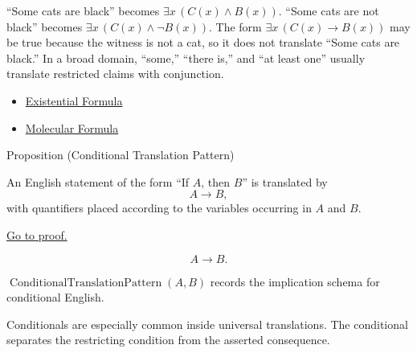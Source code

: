 \begin{remark*}[Exposition]
``Some cats are black'' becomes \(\exists x\,(C(x)\land B(x))\). ``Some cats are
not black'' becomes \(\exists x\,(C(x)\land \neg B(x))\). The form
\(\exists x\,(C(x)\to B(x))\) may be true because the witness is not a cat, so
it does not translate ``Some cats are black.'' In a broad domain, ``some,''
``there is,'' and ``at least one'' usually translate restricted claims with
conjunction.
\end{remark*}

\begin{dependencies}
\begin{itemize}
  \item \hyperref[def:existential-q]{Existential Formula}
  \item \hyperref[def:molecular]{Molecular Formula}
\end{itemize}
\end{dependencies}

\begin{propositionbox}{Proposition (Conditional Translation Pattern)}
\begin{proposition}
\label{prop:conditional-translation-pattern}
An English statement of the form ``If \(A\), then \(B\)'' is translated by
\[
A\to B,
\]
with quantifiers placed according to the variables occurring in \(A\) and \(B\).

\noindent\hyperref[prf:conditional-translation-pattern]{Go to proof.}
\end{proposition}
\end{propositionbox}

\begin{remark*}
\[
A\to B.
\]
\end{remark*}

\begin{remark*}
\(\operatorname{ConditionalTranslationPattern}(A,B)\) records the implication
schema for conditional English.
\end{remark*}

\begin{remark*}[Interpretation]
Conditionals are especially common inside universal translations. The
conditional separates the restricting condition from the asserted consequence.
\end{remark*}

